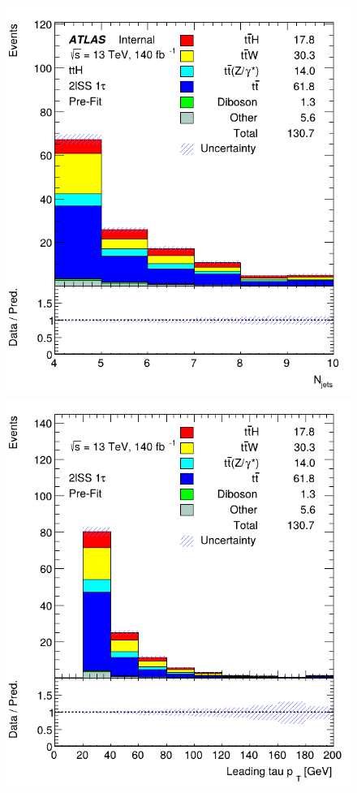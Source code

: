 \begin{figure}[ht!]
    \includegraphics[scale=0.25]{res/AnalysisPlots/n-jets.png}
    \includegraphics[scale=0.25]{res/AnalysisPlots/tau-pt-0.png}

\end{figure}
